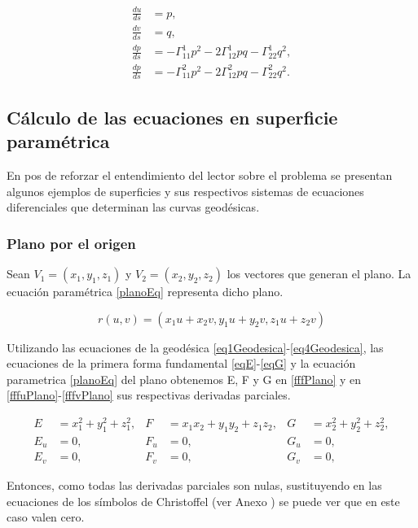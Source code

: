 \documentclass{endm}
\begin{document}
\small{
\begin{align} 
\frac{du}{ds}&=p, \label{eq1Geodesica}\\
\frac{dv}{ds}&=q, \label{eq2Geodesica}    \\
\frac{dp}{ds}&= - \Gamma_{11}^1 p^2 -2 \Gamma_{12}^1 pq - \Gamma_{22}^1 q^2, \label{eq3Geodesica}\\ 
\frac{dp}{ds}&=- \Gamma_{11}^2 p^2 -2 \Gamma_{12}^2 pq - \Gamma_{22}^2 q^2. \label{eq4Geodesica}
\end{align}
}
\subsection{C\'alculo de las ecuaciones en superficie param\'etrica}
En pos de reforzar el entendimiento del lector sobre el problema se presentan algunos ejemplos de superficies y sus respectivos sistemas de ecuaciones diferenciales que determinan las curvas geod\'esicas.

\subsubsection{Plano por el origen}
Sean $V_1=(x_1,y_1,z_1)$ y $V_2=(x_2,y_2,z_2)$ los vectores que generan el plano.
La ecuaci\'on param\'etrica \ref{planoEq} representa dicho plano.

\begin{equation} \label{planoEq}
r(u,v) = (x_1 u + x_2 v, y_1 u + y_2 v, z_1 u + z_2 v)
\end{equation}

Utilizando las ecuaciones de la geod\'esica \ref{eq1Geodesica}-\ref{eq4Geodesica}, las ecuaciones de la primera forma fundamental \ref{eqE}-\ref{eqG} y la ecuaci\'on parametrica \ref{planoEq} del plano obtenemos E, F y G en \ref{fffPlano}  y en \ref{fffuPlano}-\ref{fffvPlano} sus respectivas derivadas parciales.

\begin{align} 
E&=x_1^2 + y_1^2 + z_1^2,   & F &=x_1 x_2 + y_1 y_2 + z_1 z_2,   & G&=x_2^2 + y_2^2 + z_2^2, \label{fffPlano} \\
E_u&=0,     & F_u&=0,   & G_u&=0, \label{fffuPlano}\\
E_v&=0,    & F_v&=0,   & G_v&=0, \label{fffvPlano}
\end{align}

Entonces, como todas las derivadas parciales son nulas, sustituyendo en las ecuaciones de los s\'imbolos de Christoffel (ver Anexo \label{simbolosCr}) se puede ver que en este caso valen cero.
\end{document}
